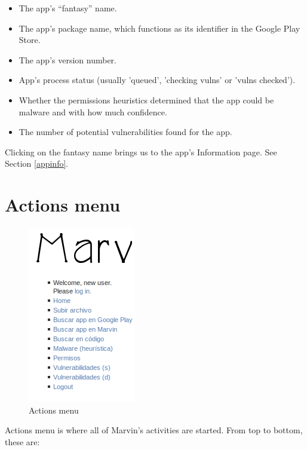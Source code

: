 \documentclass[11pt]{article}
\begin{document}
\begin{itemize}
\item The app's ``fantasy'' name.
\item The app's package name, which functions as its identifier in the Google Play Store.
\item The app's version number.
\item App's process status (usually 'queued', 'checking vulns' or 'vulns checked').
\item Whether the permissions heuristics determined that the app could be malware and with how much confidence.
\item The number of potential vulnerabilities found for the app.
\end{itemize}
Clicking on the fantasy name brings us to the app's Information page. See Section \ref{appinfo}.
\section{Actions menu}
\begin{figure}[H]
\begin{center}
\includegraphics[width=.4\textwidth]{graphics/marvin_panel.png}
\caption{Actions menu}
\end{center}
\end{figure}
Actions menu is where all of Marvin's activities are started. From top to bottom, these are:
\end{document}
